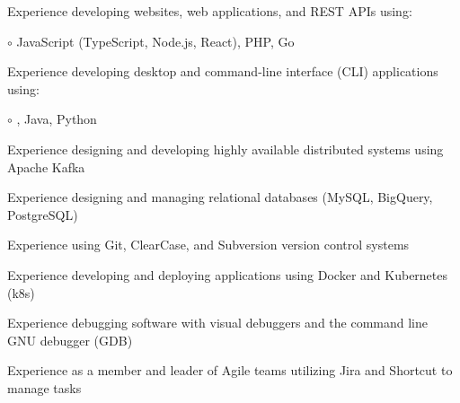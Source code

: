 \begin{itemize*}
  \item Experience developing websites, web applications, and REST APIs using: %
  \begin{itemize*}
    \vspace{-0.2em}
    \item[$\circ$] JavaScript (TypeScript, Node.js, React), PHP, Go
    \vspace{-0.2em}
  \end{itemize*}
  \item Experience developing desktop and command-line interface (CLI) applications using: %
  \begin{itemize*}
    \vspace{-0.2em}
    \item[$\circ$] \CPP, Java, Python
    \vspace{-0.2em}
  \end{itemize*}
  \item Experience designing and developing highly available distributed systems using Apache Kafka
  \item Experience designing and managing relational databases (MySQL, BigQuery, PostgreSQL)
  \item Experience using Git, ClearCase, and Subversion version control systems
  \item Experience developing and deploying applications using Docker and Kubernetes (k8s)
  \item Experience debugging software with visual debuggers and the command line GNU debugger (GDB)
  \item Experience as a member and leader of Agile teams utilizing Jira and Shortcut to manage tasks
\end{itemize*}


